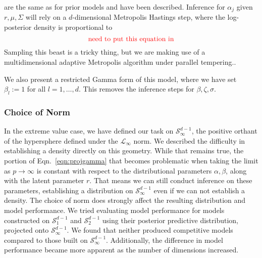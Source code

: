   are the same as for prior models and have been described.  Inference for $\alpha_j$ given
  $r, \mu,\Sigma$ will rely on a $d$-dimensional Metropolis Hastings step, where the log-posterior
  density is proportional to
  \begin{equation}
    \label{eqn:dplnlp}
    \text{{\color{red} need to put this equation in}}
  \end{equation}
  Sampling this beast is a tricky thing, but we are making use of a multidimensional adaptive Metropolis
  algorithm  under parallel
  tempering..

We also present a restricted Gamma form of this model, where we have set $\beta_l := 1$ for all
  $l = 1,\ldots,d$.  This removes the inference steps for $\beta,\zeta,\sigma$.


\subsubsection{Choice of Norm}
In the extreme value case, we have defined our task on $\mathcal{S}_{\infty}^{d-1}$, the positive orthant
  of the hypersphere defined under the $\mathcal{L}_{\infty}$ norm.  We described the difficulty in
  establishing a density directly on this geometry.  While that remains true, the portion of
  Eqn.~\ref{eqn:projgamma} that becomes problematic when taking the limit as $p\to\infty$ is constant
  with respect to the distributional parameters $\alpha,\beta$, along with the latent parameter $r$.
  That means we can still conduct inference on these parameters, establishing a distribution on
  $\mathcal{S}_{\infty}^{d-1}$ even if we can not establish a density.   The choice of norm does
  strongly affect the resulting distribution and model performance.  We tried evaluating model performance
  for models constructed on $\mathcal{S}_1^{d-1}$ and $\mathcal{S}_2^{d-1}$ using their posterior
  predictive distribution, projected onto $\mathcal{S}_{\infty}^{d-1}$.  We found that neither produced
  competitive models compared to those built on $\mathcal{S}_{\infty}^{d-1}$.  Additionally, the
  difference in model performance became more apparent as the number of dimensions increased.





